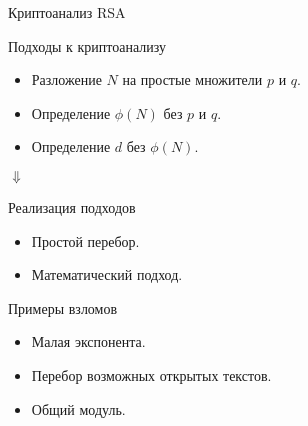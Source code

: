 \begin{frame}{Криптоанализ RSA}
	\begin{center}

		\begin{block}{Подходы к криптоанализу}
			\begin{itemize}
		        \item Разложение $N$ на простые множители $p$ и $q$.
		        \item Определение $\phi(N)$ без $p$ и $q$.
		        \item Определение $d$ без $\phi(N)$.
    		\end{itemize}
		\end{block}	 		

		$\Downarrow$

	 	\begin{block}{Реализация подходов}
	 		\begin{itemize}
		        \item Простой перебор.
		        \item Математический подход.
    		\end{itemize}
	 	\end{block}	

	 	\begin{block}{Примеры взломов}
	 		\begin{itemize}
		        \item Малая экспонента.
		        \item Перебор возможных открытых текстов.
		        \item Общий модуль.
    		\end{itemize}
	 	\end{block}	
    
	\end{center}
\end{frame}

